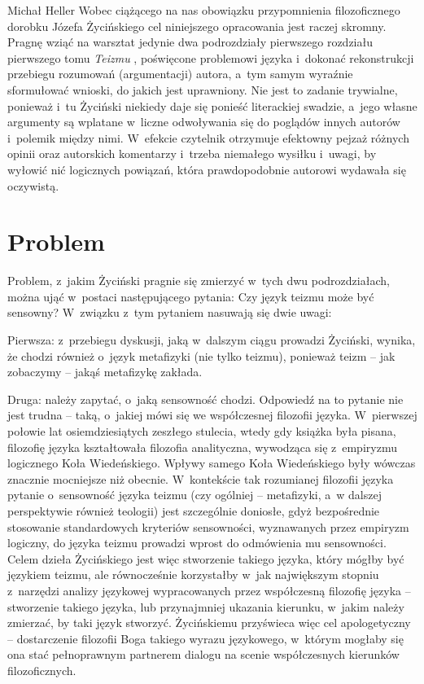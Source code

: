 \begin{artplenv}{Michał Heller}
Wobec ciążącego na nas obowiązku przypomnienia filozoficznego dorobku Józefa Życińskiego cel niniejszego opracowania jest raczej skromny. Pragnę wziąć na warsztat jedynie dwa podrozdziały pierwszego rozdziału pierwszego tomu \textit{Teizmu}
\parencite[][s.~13–36]{zycinski_teizm_1985}, %
 poświęcone problemowi języka i~dokonać rekonstrukcji przebiegu rozumowań (argumentacji) autora, a~tym samym wyraźnie sformułować wnioski, do jakich jest uprawniony. Nie jest to zadanie trywialne, ponieważ i~tu Życiński niekiedy daje się ponieść literackiej swadzie, a~jego własne argumenty są wplatane w~liczne odwoływania się do poglądów innych autorów i~polemik między nimi. W~efekcie czytelnik otrzymuje efektowny pejzaż różnych opinii oraz autorskich komentarzy i~trzeba niemałego wysiłku i~uwagi, by wyłowić nić logicznych powiązań, która prawdopodobnie autorowi wydawała się oczywistą.
 \enlargethispage{1.5\baselineskip}

\section{Problem}
Problem, z~jakim Życiński pragnie się zmierzyć w~tych dwu podrozdziałach, można ująć w~postaci następującego pytania: Czy język teizmu może być sensowny? W~związku z~tym pytaniem nasuwają się dwie uwagi:

Pierwsza: z~przebiegu dyskusji, jaką w~dalszym ciągu prowadzi Życiński, wynika, że chodzi również o~język metafizyki (nie tylko teizmu), ponieważ teizm -- jak zobaczymy -- jakąś metafizykę zakłada.

Druga: należy zapytać, o~jaką sensowność chodzi. Odpowiedź na to pytanie nie jest trudna -- taką, o~jakiej mówi się we współczesnej filozofii języka. W~pierwszej połowie lat osiemdziesiątych zeszłego stulecia, wtedy gdy książka była pisana, filozofię języka kształtowała filozofia analityczna, wywodząca się z~empiryzmu logicznego Koła Wiedeńskiego. Wpływy samego Koła Wiedeńskiego były wówczas znacznie mocniejsze niż obecnie. W~kontekście tak rozumianej filozofii języka pytanie o~sensowność języka teizmu (czy ogólniej -- metafizyki, a~w dalszej perspektywie również teologii) jest szczególnie doniosłe, gdyż bezpośrednie stosowanie standardowych kryteriów sensowności, wyznawanych przez empiryzm logiczny, do języka teizmu prowadzi wprost do odmówienia mu sensowności. Celem dzieła Życińskiego jest więc stworzenie takiego języka, który mógłby być językiem teizmu, ale równocześnie korzystałby w~jak największym stopniu z~narzędzi analizy językowej wypracowanych przez współczesną filozofię języka -- stworzenie takiego języka, lub przynajmniej ukazania kierunku, w~jakim należy zmierzać, by taki język stworzyć. Życińskiemu przyświeca więc cel apologetyczny -- dostarczenie filozofii Boga takiego wyrazu językowego, w~którym mogłaby się ona stać pełnoprawnym partnerem dialogu na scenie współczesnych kierunków filozoficznych.


\end{artplenv}
